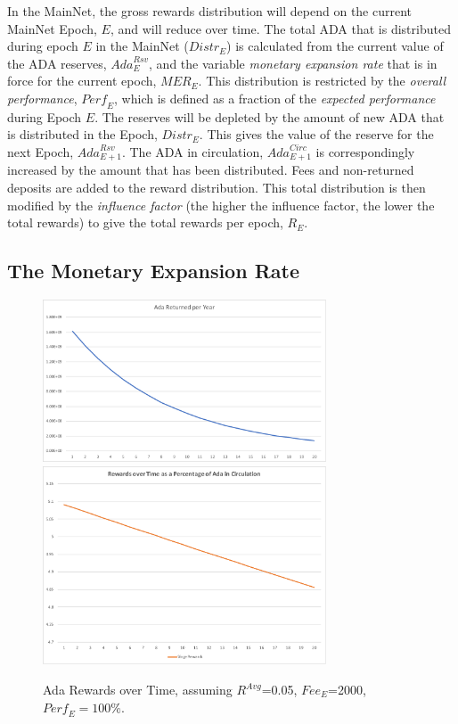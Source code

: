 \documentclass[11pt,a4paper,dvipsnames,twosided,final]{article}
\newcommand{\ada}{ADA{}}
\begin{document}
\noindent
In the MainNet, the gross rewards distribution will depend on the current MainNet Epoch, $E$, and will reduce over time.
The total \ada{} that is distributed during epoch $E$ in the MainNet (${\textit{Distr}}_E$) is calculated from the current
value of the \ada{} reserves, $\textit{Ada}^{\textit{Rsv}}_E$, and the variable \emph{monetary expansion rate} that is in force for
the current epoch, $\textit{MER}_E$.
%
This distribution is restricted by the \emph{overall performance}, $\textit{Perf}_E$, which is defined as a fraction of the \emph{expected performance} during Epoch $E$.
%
The reserves will be depleted by the amount of new \ada{} that is distributed in the Epoch, $\textit{Distr}_E$. This gives the
value of the reserve for the next Epoch, $\textit{Ada}^{\textit{Rsv}}_{E+1}$.  The \ada{} in circulation, $\textit{Ada}^{\textit{Circ}}_{E+1}$
is correspondingly increased by the amount that has been distributed.
%
Fees and non-returned deposits are added to the reward distribution.  This total distribution is then modified by the \emph{influence factor}
(the higher the influence factor, the lower the total rewards) to give the total rewards per epoch, $R_E$.

\subsection{The Monetary Expansion Rate}
\label{sec:expansion}

\begin{figure}[h!]
  \begin{center}
    \includegraphics[width=0.75\textwidth]{AdaPerYear.pdf}
\\[2ex]
    \includegraphics[width=0.75\textwidth]{Rewards.pdf}
  \end{center}
  \caption{Ada Rewards over Time, assuming $R^{\textit{Avg}}$=0.05, $\textit{Fee}_E$=2000, $\textit{Perf}_E=100\%$.}
\end{figure}
\end{document}
